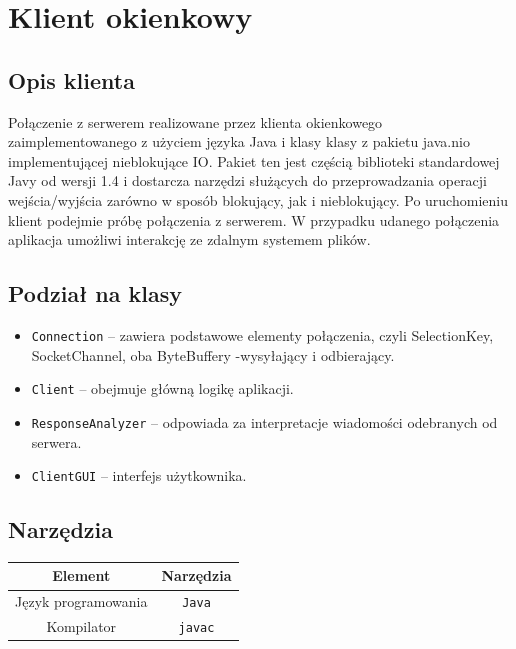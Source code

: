 \documentclass[8pt,a4paper]{article}
\begin{document}
\section{Klient okienkowy}

\subsection{Opis klienta}
Połączenie z serwerem realizowane przez klienta okienkowego zaimplementowanego z użyciem języka Java i klasy klasy z pakietu java.nio implementującej nieblokujące IO. Pakiet ten jest częścią biblioteki standardowej Javy od wersji 1.4 i dostarcza narzędzi służących do przeprowadzania operacji wejścia/wyjścia zarówno w sposób blokujący, jak i nieblokujący. Po uruchomieniu klient podejmie próbę połączenia z serwerem. W przypadku udanego połączenia aplikacja umożliwi interakcję ze zdalnym systemem plików.

\subsection{Podział na klasy}
\begin{itemize}
    \item \texttt{Connection} -- zawiera podstawowe elementy  połączenia, czyli SelectionKey, SocketChannel, oba ByteBuffery -wysyłający i odbierający.
    \item \texttt{Client} -- obejmuje główną logikę aplikacji.
    \item \texttt{ResponseAnalyzer} -- odpowiada za interpretacje wiadomości odebranych od serwera.
    \item \texttt{ClientGUI} -- interfejs użytkownika.
\end{itemize}

\subsection{Narzędzia}
\bgroup
    \begin{center}
        \def\arraystretch{1.3}
        \begin{tabular}{c|c}
            \textbf{Element} & \textbf{  Narzędzia  } \\
            \hline
            Język programowania & \texttt{Java}  \\
            \hline
            Kompilator & \texttt{javac} \\
        
        \end{tabular}
    \end{center}
\egroup
\end{document}
